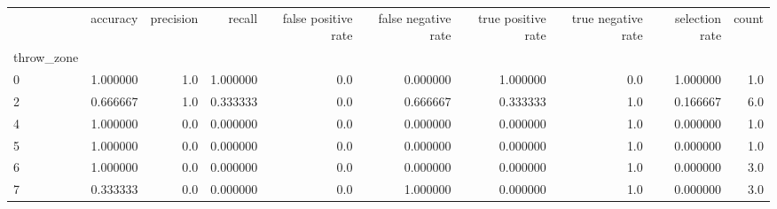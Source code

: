 \begin{tabular}{lrrrrrrrrr}
\toprule
{} &  accuracy &  precision &    recall &  false positive rate &  false negative rate &  true positive rate &  true negative rate &  selection rate &  count \\
throw\_zone &           &            &           &                      &                      &                     &                     &                 &        \\
\midrule
0          &  1.000000 &        1.0 &  1.000000 &                  0.0 &             0.000000 &            1.000000 &                 0.0 &        1.000000 &    1.0 \\
2          &  0.666667 &        1.0 &  0.333333 &                  0.0 &             0.666667 &            0.333333 &                 1.0 &        0.166667 &    6.0 \\
4          &  1.000000 &        0.0 &  0.000000 &                  0.0 &             0.000000 &            0.000000 &                 1.0 &        0.000000 &    1.0 \\
5          &  1.000000 &        0.0 &  0.000000 &                  0.0 &             0.000000 &            0.000000 &                 1.0 &        0.000000 &    1.0 \\
6          &  1.000000 &        0.0 &  0.000000 &                  0.0 &             0.000000 &            0.000000 &                 1.0 &        0.000000 &    3.0 \\
7          &  0.333333 &        0.0 &  0.000000 &                  0.0 &             1.000000 &            0.000000 &                 1.0 &        0.000000 &    3.0 \\
\bottomrule
\end{tabular}
